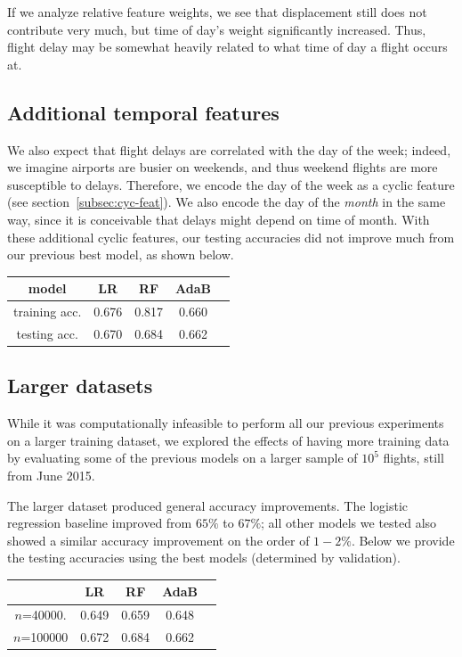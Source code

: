 \documentclass{article}
\begin{document}
\begin{multicols}{2}
If we analyze relative feature weights,
we see that displacement still does not contribute very much,
but time of day's weight significantly increased.
Thus, flight delay may be somewhat heavily related to
what time of day a flight occurs at.

\subsection{Additional temporal features}


We also expect that flight delays are correlated
with the day of the week;
indeed, we imagine airports are busier on weekends,
and thus weekend flights are more susceptible to delays.
Therefore,
we encode the day of the week as a cyclic feature
(see section~\ref{subsec:cyc-feat}).
We also encode the day of the \emph{month} in the same way,
since it is conceivable that delays might depend on time of month.
With these additional cyclic features,
our testing accuracies did not improve much
from our previous best model,
as shown below.

\begin{center}
    \begin{tabular}{c|cccc}
        model &
          LR & RF & AdaB \\\hline
        training acc. &
          0.676 & 0.817 & 0.660 \\
        testing acc. &
          0.670 & 0.684 & 0.662
    \end{tabular}
\end{center}

\subsection{Larger datasets}

While it was computationally infeasible
to perform all our previous experiments
on a larger training dataset,
we explored the effects of having more training data
by evaluating some of the previous models
on a larger sample of $10^5$ flights,
still from June 2015.

The larger dataset produced general accuracy improvements.
The logistic regression baseline improved from $65\%$ to $67\%$;
all other models we tested also showed a similar accuracy improvement
on the order of $1-2\%$.
Below we provide the testing accuracies
using the best models (determined by validation).

\begin{center}
    \begin{tabular}{c|cccc}
        &
          LR & RF & AdaB \\\hline
        $n$=40000. &
          0.649 & 0.659 & 0.648 \\
        $n$=100000 &
          0.672 & 0.684 & 0.662
    \end{tabular}
\end{center}


\end{multicols}
\end{document}
